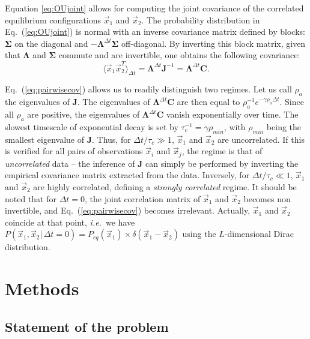 \documentclass[preprint,amsmath,amssymb,superscriptaddress,showpacs,pre]{revtex4-1}
\newcommand{\ie}{\emph{i.e.}}
\def\vx{\vec x}
\newcommand{\Lam}{\bm{\Lambda}}
\newcommand{\Sig}{\bm{\Sigma}}
\begin{document}
Equation \eqref{eq:OUjoint} allows for computing the joint covariance of the correlated equilibrium configurations $\vx_1$ and $\vx_2$. 
The probability distribution in Eq.~(\ref{eq:OUjoint}) is normal with an inverse covariance matrix defined by blocks: $\Sig$ on the diagonal and $-\Lam^{\Delta t}\Sig$ off-diagonal. 
By inverting this block matrix, given that $\Lam$ and $\Sig$ commute and are invertible, one obtains the following covariance: 
\begin{equation}
	\langle \vx_1\vx_2^T \rangle_{\Delta t} = \Lam^{\Delta t}\bm{J}^{-1} = \Lam^{\Delta t}\bm{C}. 
	\label{eq:pairwisecov}
\end{equation}


Eq.~(\ref{eq:pairwisecov}) allows us to readily distinguish two regimes. 
Let us call $\rho_a$ the eigenvalues of $\bm{J}$. 
The eigenvalues of $\Lam^{\Delta t}\bm{C}$ are then equal to $\rho_a^{-1}e^{-\gamma\rho_a\Delta t}$. 
Since all $\rho_a$ are positive, the eigenvalues of $\Lam^{\Delta t}\bm{C}$ vanish exponentially over time. The slowest timescale of exponential decay is set by $\tau_c^{-1} = \gamma\rho_{min}$, with $\rho_{min}$ being the smallest eigenvalue of $\bm{J}$. 
Thus, for $\Delta t / \tau_c \gg 1$, $\vx_1$ and $\vx_2$ are uncorrelated. 
If this is verified for all pairs of observations $\vx_i$ and $\vx_j$, the regime is that of \emph{uncorrelated} data -- the inference of $\bm{J}$ can simply be performed by inverting the empirical covariance matrix extracted from the data. 
Inversely, for $\Delta t / \tau_c \ll 1$, $\vx_1$ and $\vx_2$ are highly correlated, defining a \emph{strongly correlated} regime. 
It should be noted that for $\Delta t = 0$, the joint correlation matrix of $\vx_1$ and $\vx_2$ becomes non invertible, and Eq.~(\ref{eq:pairwisecov}) becomes irrelevant. Actually, $\vx_1$ and $\vx_2$ coincide at that point, \ie~we have $P(\vx_1,\vx_2|\,\Delta t=0) = P_{eq}(\vx_1) \times \delta(\vx_1 - \vx_2)$ using the $L$-dimensional Dirac distribution.






\section{Methods}
\label{sec:methods}

\subsection{Statement of the problem}
\label{sub:statement_of_the_problem}
\end{document}
